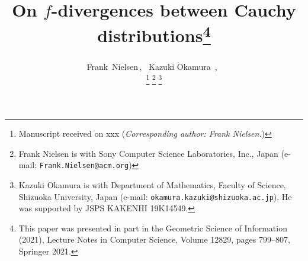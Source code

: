 \documentclass[journal]{IEEEtran}
\begin{document}
%
\title{On $f$-divergences between Cauchy distributions\thanks{This paper was presented in part in the Geometric Science of Information (2021), Lecture Notes in Computer Science, Volume 12829, pages 799--807, Springer 2021.}}
%
%
%

\author{Frank~Nielsen\textsuperscript{}\,,~
Kazuki Okamura \textsuperscript{}\,,~

\thanks{Manuscript received on xxx 
(\emph{Corresponding author: Frank Nielsen.})}
\thanks{Frank Nielsen is with
Sony Computer Science Laboratories, Inc., Japan (e-mail: \texttt{Frank.Nielsen@acm.org})}
\thanks{Kazuki Okamura is with
Department of Mathematics, Faculty of Science, Shizuoka University, Japan
(e-mail: \texttt{okamura.kazuki@shizuoka.ac.jp}). He was supported by JSPS KAKENHI 19K14549.}}

\end{document}
